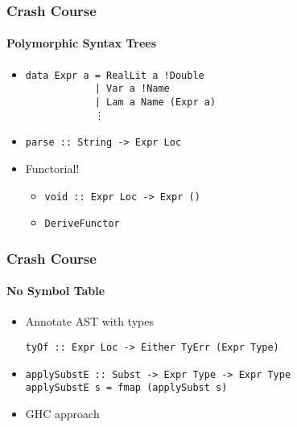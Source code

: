 \documentclass{beamer}
\begin{document}
\begin{frame}[fragile]
  \frametitle{Crash Course}
  \framesubtitle{Polymorphic Syntax Trees}
    \begin{itemize}
      \item
      \begin{verbatim}
data Expr a = RealLit a !Double
            | Var a !Name
            | Lam a Name (Expr a)
            ⋮
\end{verbatim}
      \item \verb|parse :: String -> Expr Loc|
      \item Functorial!
        \begin{itemize}
          \item \verb|void :: Expr Loc -> Expr ()|
          \item \verb|DeriveFunctor|
        \end{itemize}
    \end{itemize}
\end{frame}

\begin{frame}[fragile]
  \frametitle{Crash Course}
  \framesubtitle{No Symbol Table}
  \begin{itemize}
      \item Annotate AST with types
        \begin{verbatim}
tyOf :: Expr Loc -> Either TyErr (Expr Type)
        \end{verbatim}
      \item
        \begin{verbatim}
applySubstE :: Subst -> Expr Type -> Expr Type
applySubstE s = fmap (applySubst s)
        \end{verbatim}
      \item GHC approach
  \end{itemize}
\end{frame}
\end{document}
